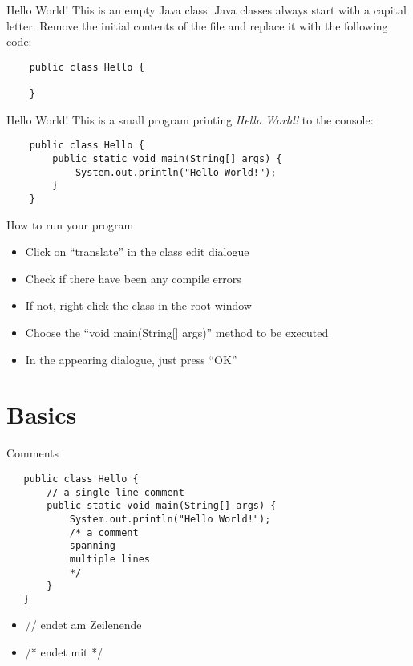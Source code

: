\begin{frame}[fragile]{Hello World!}
    This is an empty Java class.
      Java classes always start with a capital letter.
      Remove the initial contents of the file and replace it with the following code:
    \begin{lstlisting}
    public class Hello {

    }\end{lstlisting}
\end{frame}

\begin{frame}[fragile]{Hello World!}
    This is a small program printing \emph{Hello World!} to the console:
    \begin{lstlisting}
    public class Hello {
        public static void main(String[] args) {
            System.out.println("Hello World!");
        }
    }\end{lstlisting}
\end{frame}

\begin{frame}[fragile]{How to run your program}
   \begin{itemize}
      \item Click on ``translate'' in the class edit dialogue
      \item Check if there have been any compile errors
      \item If not, right-click the class in the root window
      \item Choose the ``void main(String[] args)'' method to be executed
      \item In the appearing dialogue, just press ``OK''
  \end{itemize}
\end{frame}

\section{Basics}

\begin{frame}[fragile]{Comments}
   \begin{lstlisting}
   public class Hello {
       // a single line comment
       public static void main(String[] args) {
           System.out.println("Hello World!");
           /* a comment
           spanning
           multiple lines
           */
       }
   }\end{lstlisting}
   \begin{itemize}
       \item // endet am Zeilenende
       \item /* endet mit */
   \end{itemize}
\end{frame}

